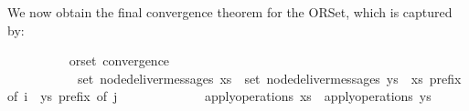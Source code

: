 We now obtain the final convergence theorem for the ORSet, which is captured by:
\vspace{0.375em}
\begin{isabellebody}
\ \ \ \ \ \ \ \  {\isacharparenleft}\ orset{\isacharparenright}\ convergence{\isacharcolon}\isanewline
\ \ \ \ \ \ \ \ \ \ \ {\isachardoublequoteopen}set\ {\isacharparenleft}node{\isacharunderscore}deliver{\isacharunderscore}messages\ xs{\isacharparenright}\ {\isacharequal}\ set\ {\isacharparenleft}node{\isacharunderscore}deliver{\isacharunderscore}messages\ ys{\isacharparenright}{\isachardoublequoteclose}\ \ {\isachardoublequoteopen}xs\ prefix\ of\ i{\isachardoublequoteclose}\ \ {\isachardoublequoteopen}ys\ prefix\ of\ j{\isachardoublequoteclose}\isanewline
\ \ \ \ \ \ \ \ \ \ \ \ \ {\isachardoublequoteopen}apply{\isacharunderscore}operations\ xs\ {\isacharequal}\ apply{\isacharunderscore}operations\ ys{\isachardoublequoteclose}
\end{isabellebody}